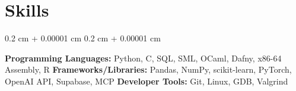 \documentclass[10pt, letterpaper]{article}
\newenvironment{highlights}{
    \begin{itemize}[
        topsep=0.10 cm,
        parsep=0.10 cm,
        partopsep=0pt,
        itemsep=0pt,
        leftmargin=0.4 cm + 10pt
    ]
}{
    \end{itemize}
} %
\newenvironment{onecolentry}{
    \begin{adjustwidth}{
        0.2 cm + 0.00001 cm
    }{
        0.2 cm + 0.00001 cm
    }
}{
    \end{adjustwidth}
} %
\begin{document}
    \section{Skills}
        \begin{onecolentry}
            \textbf{Programming Languages:} Python, C, SQL, SML, OCaml, Dafny, x86-64 Assembly, R \newline
            \textbf{Frameworks/Libraries:} Pandas, NumPy, scikit-learn, PyTorch, OpenAI API, Supabase, MCP \newline
            \textbf{Developer Tools:} Git, Linux, GDB, Valgrind
        \end{onecolentry}
    \vspace{0.20 cm}

    

    
\end{document}

